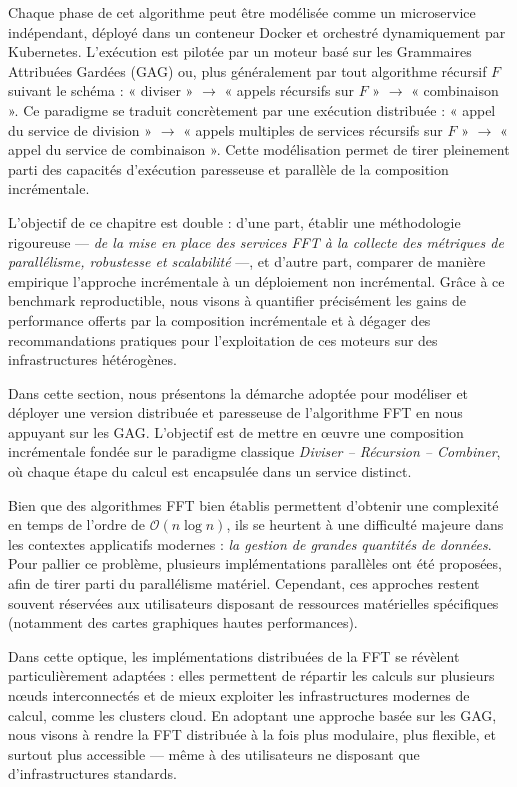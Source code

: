 Chaque phase de cet algorithme peut être modélisée comme un microservice indépendant, déployé dans un conteneur Docker et orchestré dynamiquement par Kubernetes. L'exécution est pilotée par un moteur basé sur les Grammaires Attribuées Gardées (GAG) ou, plus généralement par tout algorithme récursif $F$ suivant le schéma : « diviser » $\rightarrow$ « appels récursifs sur $F$ » $\rightarrow$ « combinaison ». Ce paradigme se traduit concrètement par une exécution distribuée : « appel du service de division » $\rightarrow$ « appels multiples de services récursifs sur $F$ » $\rightarrow$ « appel du service de combinaison ». Cette modélisation permet de tirer pleinement parti des capacités d'exécution paresseuse et parallèle de la composition incrémentale.

L’objectif de ce chapitre est double : d’une part, établir une méthodologie rigoureuse — \textit{de la mise en place des services FFT à la collecte des métriques de parallélisme, robustesse et scalabilité} —, et d’autre part, comparer de manière empirique l’approche incrémentale à un déploiement non incrémental. Grâce à ce benchmark reproductible, nous visons à quantifier précisément les gains de performance offerts par la composition incrémentale et à dégager des recommandations pratiques pour l’exploitation de ces moteurs sur des infrastructures hétérogènes.%

Dans cette section, nous présentons la démarche adoptée pour modéliser et déployer une version distribuée et paresseuse de l’algorithme FFT en nous appuyant sur les GAG. L’objectif est de mettre en œuvre une composition incrémentale fondée sur le paradigme classique \textit{Diviser – Récursion – Combiner}, où chaque étape du calcul est encapsulée dans un service distinct.

Bien que des algorithmes FFT bien établis permettent d’obtenir une complexité en temps de l’ordre de $\mathcal{O}(n \log n)$, ils se heurtent à une difficulté majeure dans les contextes applicatifs modernes : \textit{la gestion de grandes quantités de données}. Pour pallier ce problème, plusieurs implémentations parallèles ont été proposées, afin de tirer parti du parallélisme matériel. Cependant, ces approches restent souvent réservées aux utilisateurs disposant de ressources matérielles spécifiques (notamment des cartes graphiques hautes performances).

Dans cette optique, les implémentations distribuées de la FFT se révèlent particulièrement adaptées : elles permettent de répartir les calculs sur plusieurs nœuds interconnectés et de mieux exploiter les infrastructures modernes de calcul, comme les clusters cloud. En adoptant une approche basée sur les GAG, nous visons à rendre la FFT distribuée à la fois plus modulaire, plus flexible, et surtout plus accessible — même à des utilisateurs ne disposant que d’infrastructures standards.

